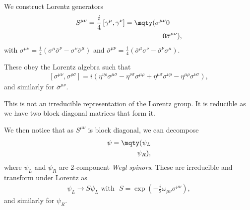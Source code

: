 We construct Lorentz generators
\begin{align}
    S^{\mu \nu} = \frac{i}{4} \left[ \gamma^{\mu}, \gamma^{\nu} \right] = \mqty( \sigma^{\mu \nu} & 0 \\ 0 & \overline{\sigma}^{\mu \nu} )
,\end{align}
with $\sigma^{\mu \nu} = \frac{i}{4} \left( \sigma^{\mu} \overline{\sigma}^{\nu} - \sigma^{\nu} \overline{\sigma}^{\mu} \right) $ and $\overline{\sigma}^{\mu \nu} = \frac{i}{4} \left( \overline{\sigma}^{\mu} \sigma^{\nu} - \overline{\sigma}^{\nu} \sigma^{\mu} \right) $.

These obey the Lorentz algebra such that
\begin{align}
    \left[ \sigma^{\mu \nu}, \sigma^{\rho \sigma} \right] = i \left( \eta^{\nu \rho} \sigma^{\mu \sigma} - \eta^{\nu \sigma} \sigma^{\mu \rho} + \eta^{\mu \sigma} \sigma^{\nu \rho} - \eta^{\mu \rho} \sigma^{\nu \sigma} \right) 
,\end{align}
and similarly for $\overline{\sigma}^{\mu \nu}$.
\begin{note}
    This is not an irreducible representation of the Lorentz group. It is reducible as we have two block diagonal matrices that form it.
\end{note}

We then notice that as $S^{\mu \nu}$ is block diagonal, we can decompose
\begin{align}
    \psi = \mqty( \psi_L \\ \psi_R )
,\end{align}
where $\psi_L$ and $\psi_R$ are 2-component \textit{Weyl spinors}. These are irreducible and transform under Lorentz as
\begin{align}
    \psi_L \to S \psi_L \text{~with ~} S = \exp \left(-\frac{i}{2} \omega_{\mu \nu} \sigma^{\mu \nu} \right) 
,\end{align}
and similarly for $\psi_R$.






